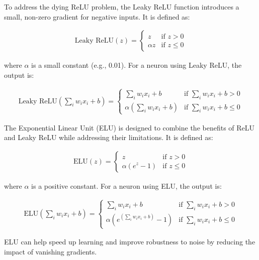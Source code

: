 To address the dying ReLU problem, the Leaky ReLU function introduces a small, non-zero gradient for negative inputs.
It is defined as:

\begin{align}
  \text{Leaky ReLU}(z) = \begin{cases}
    z & \text{if } z > 0 \\
    \alpha z & \text{if } z \leq 0
  \end{cases}
\end{align}

where \( \alpha \) is a small constant (e.g., 0.01).
For a neuron using Leaky ReLU, the output is:

\begin{align}
  \text{Leaky ReLU}(\sum_i w_i x_i + b) = \begin{cases}
    \sum_i w_i x_i + b & \text{if } \sum_i w_i x_i + b > 0 \\
    \alpha (\sum_i w_i x_i + b) & \text{if } \sum_i w_i x_i + b \leq 0
  \end{cases}
\end{align}

The Exponential Linear Unit (ELU) is designed to combine the benefits of ReLU and Leaky ReLU while addressing their limitations.
It is defined as:

\begin{align}
  \text{ELU}(z) = \begin{cases}
    z & \text{if } z > 0 \\
    \alpha (e^z - 1) & \text{if } z \leq 0
  \end{cases}
\end{align}

where \( \alpha \) is a positive constant.
For a neuron using ELU, the output is:

\begin{align}
  \text{ELU}(\sum_i w_i x_i + b) = \begin{cases}
    \sum_i w_i x_i + b & \text{if } \sum_i w_i x_i + b > 0 \\
    \alpha (e^{(\sum_i w_i x_i + b)} - 1) & \text{if } \sum_i w_i x_i + b \leq 0
  \end{cases}
\end{align}

ELU can help speed up learning and improve robustness to noise by reducing the impact of vanishing gradients.

